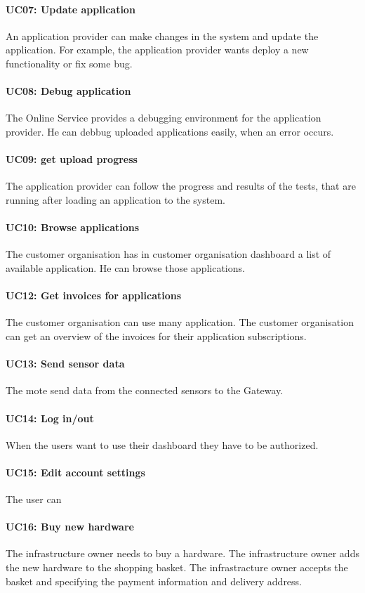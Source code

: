 \paragraph{UC07: Update application}
An application provider can make changes in the system and update the application. 
For example, the application provider wants deploy a new functionality or fix
some bug.
\paragraph{UC08: Debug application}
The Online Service provides a debugging environment for the application provider.
He can debbug uploaded applications easily, when an error occurs.
\paragraph{UC09: get upload progress}
The application provider can follow the progress and results of the tests, that
are running after loading an application to the system. 
\paragraph{UC10: Browse applications}
The customer organisation has in customer organisation dashboard a list of available
application. He can browse those applications. 
\paragraph{UC12: Get invoices for applications }
The customer organisation can use many application. The customer organisation can get an 
overview of the invoices for their application subscriptions.
\paragraph{UC13: Send sensor data}
The mote send data from the connected sensors to the Gateway.
\paragraph{UC14: Log in/out }
When the users want to use their dashboard they have to be authorized.
\paragraph{UC15: Edit account settings}
The user can 
\paragraph{UC16: Buy new hardware }
The infrastructure owner needs to buy a hardware. The infrastructure 
owner adds the new hardware to the shopping basket. The infrastracture owner accepts 
the basket and specifying the payment information and delivery address.
